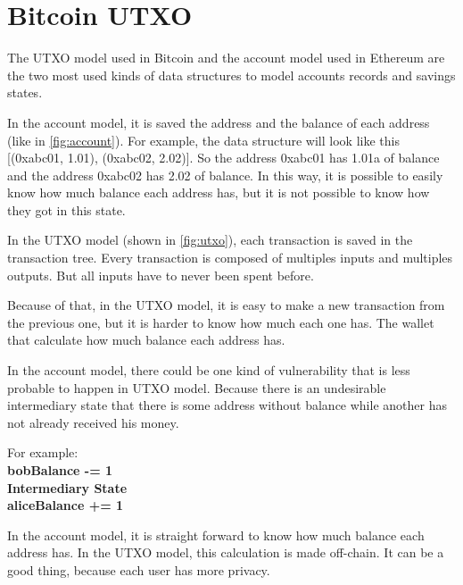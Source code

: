 \section{Bitcoin UTXO}

The UTXO model used in Bitcoin and the account model used in Ethereum are the two most used kinds
of data structures to model accounts records and savings states.


In the account model, it is saved the address and the balance of each address
(like in \ref{fig:account}).
For example, the data structure will look like this [(0xabc01, 1.01), (0xabc02, 2.02)].
So the address 0xabc01 has 1.01a of balance and the address 0xabc02 has 2.02 of balance.
In this way, it is possible to easily know how much balance each address has,
but it is not possible to know how they got in this state.


In the UTXO model (shown in \ref{fig:utxo}), each transaction is saved in the transaction tree.
Every transaction is composed of multiples inputs and multiples outputs.
But all inputs have to never been spent before.

Because of that, in the UTXO model, it is easy to make a new transaction from the previous one,
but it is harder to know how much each one has.
The wallet that calculate how much balance each address has.

In the account model, there could be one kind of vulnerability that is less probable to happen in UTXO
model.
Because there is an undesirable intermediary state that there is some address without balance while
another has not already received his money.

For example: \\
\textbf{
bobBalance -= 1 \\
Intermediary State \\
aliceBalance += 1
}

In the account model, it is straight forward to know how much balance each address has.
In the UTXO model, this calculation is made off-chain. It can be a good thing,
because each user has more privacy.
